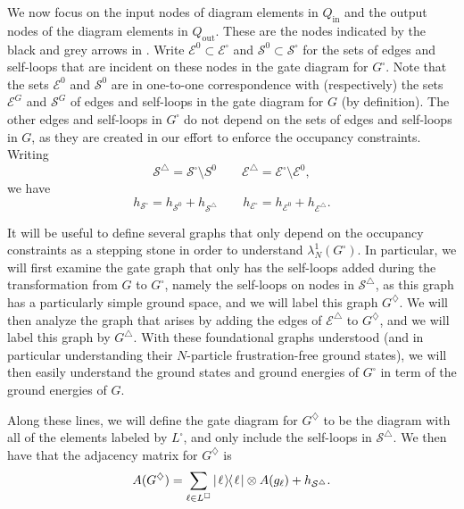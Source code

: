 \documentclass[../thesis-main/thesis-main]{subfiles}
\begin{document}
We now focus on the input nodes of diagram elements in $Q_{\text{in}}$ and the output nodes of the diagram elements in $Q_{\text{out}}$. These are the nodes indicated by the black and grey arrows in . Write $\mathcal{E}^{0}\subset\mathcal{E}^{\square}$ and $\mathcal{S}^{0}\subset\mathcal{S^{\square}}$ for the sets of edges and self-loops that are incident on these nodes in the gate diagram for $G^{\square}$. Note that the sets $\mathcal{E}^{0}$ and $\mathcal{S}^{0}$ are in one-to-one correspondence with (respectively) the sets $\mathcal{E}^{G}$ and $\mathcal{S}^{G}$ of edges and self-loops in the gate diagram for $G$ (by definition). The other edges and self-loops in $G^{\square}$ do not depend on the sets of edges and self-loops in $G$, as they are created in our effort to enforce the occupancy constraints. Writing
\begin{equation}
\mathcal{S}^{\triangle}=\mathcal{S}^{\square}\setminus S^{0}\qquad\mathcal{E}^{\triangle}=\mathcal{E}^{\square}\setminus\mathcal{E}^{0},
\end{equation}
we have 
\begin{equation}
h_{\mathcal{S}^{\square}}=h_{\mathcal{S}^{0}}+h_{\mathcal{S}^{\triangle}}\qquad h_{\mathcal{E}^{\square}}=h_{\mathcal{E}^{0}}+h_{\mathcal{E}^{\triangle}}.\label{eq:h_se_square}
\end{equation}

It will be useful to define several graphs that only depend on the occupancy constraints as a stepping stone in order to understand $\lambda_N^1(G^\square)$.  In particular, we will first examine the gate graph that only has the self-loops added during the transformation from $G$ to $G^{\square}$, namely the self-loops on nodes in $\mathcal{S}^{\triangle}$, as this graph has a particularly simple ground space, and we will label this graph $G^{\diamondsuit}$.  We will then analyze the graph that arises by adding the edges of $\mathcal{E}^{\triangle}$ to $G^\diamondsuit$, and we will label this graph by $G^{\triangle}$.  With these foundational graphs understood (and in particular understanding their $N$-particle frustration-free ground states), we will then easily understand the ground states and ground energies of $G^{\square}$ in term of the ground energies of $G$.

Along these lines, we will define the gate diagram for $G^{\diamondsuit}$ to be the diagram with all of the elements labeled by $L^{\square}$, and only include the self-loops in $\mathcal{S}^{\triangle}$.  We then have that the adjacency matrix for $G^{\diamondsuit}$ is 
\begin{equation}
  A(G^{\diamondsuit}) = \sum_{\ell \in L^{\square}} |\mspace{2mu} \ell \mspace{2mu} \rangle\mspace{-2mu}\langle\mspace{2mu} \ell \mspace{2mu} | \otimes A(g_\ell) + h_{\mathcal{S}^\triangle}\label{eq:A_G_diamond_defn}.
\end{equation}
\end{document}
